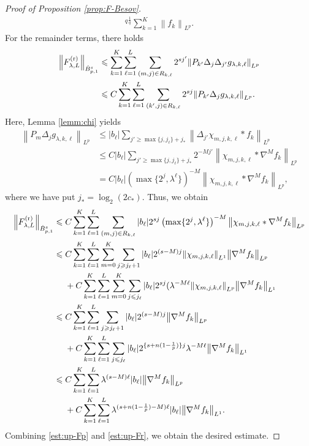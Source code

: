 \documentclass[a4paper,12pt,reqno]{amsart}
\theoremstyle{plain}
\theoremstyle{definition}
\newcommand{\dB}{\dot{B}}
\renewcommand{\leq}{\leqslant}
\renewcommand{\geq}{\geqslant}
\newcommand{\n}[1]{{\left\|#1\right\|}}
\renewcommand{\sp}[1]{\left(#1\right)}
\renewcommand{\r}{{\rm r}}
\begin{document}
\begin{proof}[Proof of Proposition \ref{prop:F-Besov}]
\begin{align}
{{    }^q
    }^{\frac{1}{q}}
    \sum_{k=1}^K
    \n{f_k}_{L^p}.
    \label{est:up-Fp}
\end{align}
For the remainder terms, there holds
\begin{align}
    \n{F_{\lambda,L}^{(\r)}}_{\dB_{p,1}^s}
    &
    \leq 
    \sum_{k=1}^K
    \sum_{\ell=1}^L
    \sum_{(m,j) \in R_{k,\ell}}
    2^{sj'}
    \n{P_{k'}\Delta_j\Delta_{j'}g_{\lambda,k,\ell}}_{L^p}
    \\
    &
    \leq 
    C
    \sum_{k=1}^K
    \sum_{\ell=1}^L
    \sum_{(k',j) \in R_{k,\ell}}
    2^{sj}
    \n{P_{k'}\Delta_jg_{\lambda,k,\ell}}_{L^p}.
\end{align}
Here, Lemma \ref{lemm:chi} yields 
\begin{align}
    \n{P_m\Delta_jg_{\lambda,k,\ell}}_{L^p}
    &
    \leq 
    |b_\ell|
    \sum_{j'\geq \max\{j,j_{\ell}\}+j_*}
    \n{
    \Delta_{j'}
    \chi_{m,j,k,\ell}*f_k
    }_{L^p}
    \\
    &\leq 
    C|b_\ell|
    \sum_{j'\geq \max\{j,j_{\ell}\}+j_*}
    2^{-Mj'}
    \n{
    \chi_{m,j,k,\ell}*\nabla^Mf_k
    }_{L^p}
    \\
    &=
    C|b_\ell|\sp{\max\{2^j,\lambda^\ell\}}^{-M}
    \n{\chi_{m,j,k,\ell}*\nabla^Mf_k}_{L^p},
\end{align}
where we have put $j_* = \log_2(2c_*)$. 
Thus, we obtain
\begin{align}
    \n{F_{\lambda,L}^{(\r)}}_{\dB_{p,1}^s}
    \leq {}&
    C
    \sum_{k=1}^K
    \sum_{\ell=1}^L
    \sum_{(m,j) \in R_{k,\ell}}
    |b_\ell|
    2^{sj}
    \sp{\max\{2^j,\lambda^\ell\}}^{-M}
    \n{\chi_{m,j,k,\ell}*\nabla^Mf_k}_{L^p}\\
    \leq {}&
    C
    \sum_{k=1}^K
    \sum_{\ell=1}^L
    \sum_{m=0}^K
    \sum_{j \geq j_{\ell}+1}
    |b_\ell|
    2^{(s-M)j}
    \n{\chi_{m,j,k,\ell}}_{L^1}
    \n{\nabla^Mf_k}_{L^p}
    \\
    & + 
    C
    \sum_{k=1}^K
    \sum_{\ell=1}^L
    \sum_{m=0}^K
    \sum_{j \leq j_{\ell}}
    |b_\ell|
    2^{sj}
    (\lambda^{-M\ell}
    \n{\chi_{m,j,k,\ell}}_{L^p}
    \n{\nabla^Mf_k}_{L^1}\\
    \leq {}&
    C
    \sum_{k=1}^K
    \sum_{\ell=1}^L
    \sum_{j \geq j_{\ell}+1}
    |b_\ell|
    2^{(s-M)j}
    \n{\nabla^Mf_k}_{L^p}
    \\
    & + 
    C
    \sum_{k=1}^K
    \sum_{\ell=1}^L
    \sum_{j \leq j_{\ell}}
    |b_\ell|
    2^{\{s+n(1-\frac{1}{p})\}j}
    \lambda^{-M\ell}
    \n{\nabla^Mf_k}_{L^1}\\
    \leq {}&
    C
    \sum_{k=1}^K
    \sum_{\ell=1}^L
    \lambda^{(s-M)\ell}
    |b_{\ell}|
    \n{\nabla^Mf_k}_{L^p}
    \\
    &
    +
    C
    \sum_{k=1}^K
    \sum_{\ell=1}^L
    \lambda^{(s+n(1-\frac{1}{p})-M)\ell}
    |b_{\ell}|
    \n{\nabla^Mf_k}_{L^1}.
    \label{est:up-Fr}
\end{align}
Combining \eqref{est:up-Fp} and \eqref{est:up-Fr}, we obtain the desired estimate.
%


\end{proof}
\end{document}
